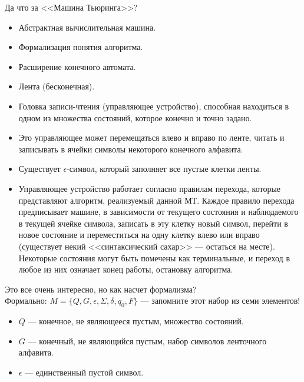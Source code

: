 


    \Header

    \BeginConspect

    
   
    \begin{Def}
        Да что за <<Машина Тьюринга>>?
        \begin{itemize}
            \item Абстрактная вычислительная машина.
            \item Формализация понятия алгоритма.
            \item Расширение конечного автомата.
            \item Лента (бесконечная).
            \item Головка записи-чтения (управляющее устройство), способная находиться в одном из множества состояний, которое конечно и точно задано.
            \item Это управляющее может перемещаться влево и вправо по ленте, читать и записывать в ячейки символы некоторого конечного алфавита.
            \item Существует $\epsilon$-символ, который заполняет все пустые клетки ленты.
            \item Управляющее устройство работает согласно правилам перехода, которые представляют алгоритм, реализуемый данной МТ. Каждое правило перехода предписывает машине, в зависимости от текущего состояния и наблюдаемого в текущей ячейке символа, записать в эту клетку новый символ, перейти в новое состояние и переместиться на одну клетку влево или вправо (существует некий <<синтаксический сахар>> --- остаться на месте). Некоторые состояния могут быть помечены как терминальные, и переход в любое из них означает конец работы, остановку алгоритма.
        \end{itemize}
        Это все очень интересно, но как насчет формализма?\\
        Формально: $M = \{Q, G, \epsilon, \Sigma, \delta, q_0, F\}$ --- запомните этот набор из семи элементов!
        \begin{itemize}
        \item $Q$ --- конечное, не являющееся пустым, множество состояний.
        \item $G$ --- конечный, не являющийся пустым, набор символов ленточного алфавита.
        \item $\epsilon$ --- единственный пустой символ.

\end{itemize}
\end{Def}

